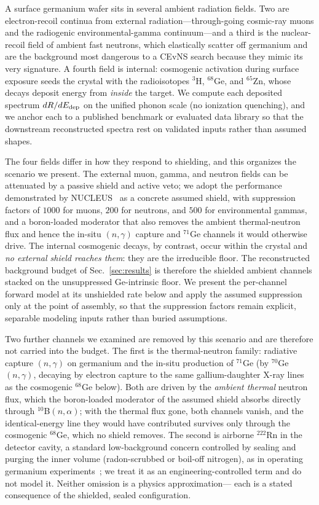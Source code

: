 A surface germanium wafer sits in several ambient radiation fields. Two
are electron-recoil continua from external radiation---through-going
cosmic-ray muons and the radiogenic environmental-gamma continuum---and a
third is the nuclear-recoil field of ambient fast neutrons, which
elastically scatter off germanium and are the background most dangerous to
a CEvNS search because they mimic its very signature. A fourth field is
internal: cosmogenic activation during surface exposure seeds the crystal
with the radioisotopes $^{3}$H, $^{68}$Ge, and $^{65}$Zn, whose decays
deposit energy from \emph{inside} the target. We compute each deposited
spectrum $dR/dE_{\rm dep}$ on the unified phonon scale (no ionization
quenching), and we anchor each to a published benchmark or evaluated data
library so that the downstream reconstructed spectra rest on validated
inputs rather than assumed shapes.

The four fields differ in how they respond to shielding, and this
organizes the scenario we present. The external muon, gamma, and neutron
fields can be attenuated by a passive shield and active veto; we adopt the
performance demonstrated by NUCLEUS~\cite{nucleus} as a concrete assumed
shield, with suppression factors of $1000$ for muons, $200$ for neutrons,
and $500$ for environmental gammas, and a boron-loaded moderator that also
removes the ambient thermal-neutron flux and hence the in-situ $(n,\gamma)$ capture
and $^{71}$Ge channels it would otherwise drive. The internal cosmogenic
decays, by contrast, occur within the crystal and \emph{no external shield
reaches them}: they are the irreducible floor. The reconstructed
background budget of Sec.~\ref{sec:results} is therefore the shielded
ambient channels stacked on the unsuppressed Ge-intrinsic floor. We
present the per-channel forward model at its unshielded rate below and
apply the assumed suppression only at the point of assembly, so that the
suppression factors remain explicit, separable modeling inputs rather than
buried assumptions.

Two further channels we examined are removed by this scenario and are
therefore not carried into the budget. The first is the thermal-neutron
family: radiative capture $(n,\gamma)$ on germanium and the in-situ
production of $^{71}$Ge (by $^{70}$Ge$(n,\gamma)$, decaying by electron
capture to the same gallium-daughter X-ray lines as the cosmogenic
$^{68}$Ge below). Both are driven by the \emph{ambient thermal} neutron
flux, which the boron-loaded moderator of the assumed shield absorbs
directly through $^{10}$B$(n,\alpha)$; with the thermal flux gone, both
channels vanish, and the identical-energy line they would have contributed
survives only through the cosmogenic $^{68}$Ge, which no shield removes.
The second is airborne $^{222}$Rn in the detector cavity, a standard
low-background concern controlled by sealing and purging the inner volume
(radon-scrubbed or boil-off nitrogen), as in operating germanium
experiments~\cite{conus2025}; we treat it as an engineering-controlled
term and do not model it. Neither omission is a physics approximation---
each is a stated consequence of the shielded, sealed configuration.

